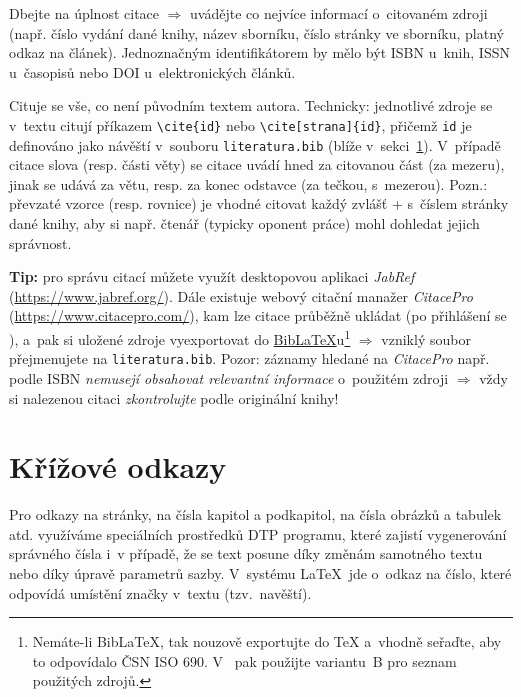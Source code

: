 Dbejte na {\color{red}úplnost citace} $\Rightarrow$ uvádějte co nejvíce informací o~citovaném zdroji (např. číslo vydání dané knihy, název sborníku, číslo stránky ve sborníku, platný odkaz na článek). Jednoznačným identifikátorem by mělo být ISBN u~knih, ISSN u~časopisů nebo DOI u~elektronických článků.
\par 
Cituje se vše, co není původním textem autora. Technicky: jednotlivé zdroje se v~textu citují příkazem \texttt{\textbackslash cite\{id\}} nebo \texttt{\textbackslash cite[strana]\{id\}}, přičemž \texttt{id} je definováno jako návěští v~souboru \texttt{literatura.bib} (blíže v~sekci~\ref{kap-odkazy}). V~případě citace slova (resp. části věty) se citace uvádí hned za citovanou část (za mezeru), jinak se udává za větu, resp. za konec odstavce (za tečkou, s~mezerou). Pozn.: převzaté vzorce (resp. rovnice) je vhodné citovat každý zvlášť + s~číslem stránky dané knihy, aby si např. čtenář (typicky oponent práce) mohl dohledat jejich správnost.
\par 
\textbf{Tip:} pro správu citací můžete využít desktopovou aplikaci \textit{JabRef} (\url{https://www.jabref.org/}). Dále existuje webový citační manažer \textit{CitacePro} (\url{https://www.citacepro.com/}), kam lze citace průběžně ukládat (po přihlášení se ), a~pak si uložené zdroje vyexportovat do \href{https://www.overleaf.com/learn/latex/Bibliography_management_with_biblatex}{BibLaTeX}u\footnote{Nemáte-li BibLaTeX, tak nouzově exportujte do TeX a~vhodně seřaďte, aby to odpovídalo ČSN ISO 690. V~ pak použijte variantu~B pro seznam použitých zdrojů.} $\Rightarrow$ vzniklý soubor přejmenujete na \texttt{literatura.bib}.
Pozor: záznamy hledané na \textit{CitacePro} např. podle ISBN \textit{nemusejí obsahovat relevantní informace} o~použitém zdroji $\Rightarrow$ vždy si nalezenou citaci \textit{zkontrolujte} podle originální knihy!



\section{Křížové odkazy} \label{kap-odkazy}
Pro odkazy na stránky, na čísla kapitol a podkapitol, na čísla obrázků a tabulek atd. využíváme
speciálních prostředků DTP programu, které zajistí vygenerování správného čísla i~v případě, že se
text posune díky změnám samotného textu nebo díky úpravě parametrů sazby. V~systému \LaTeX\ jde o~odkaz na číslo, které odpovídá umístění značky v~textu (tzv.~navěští).

